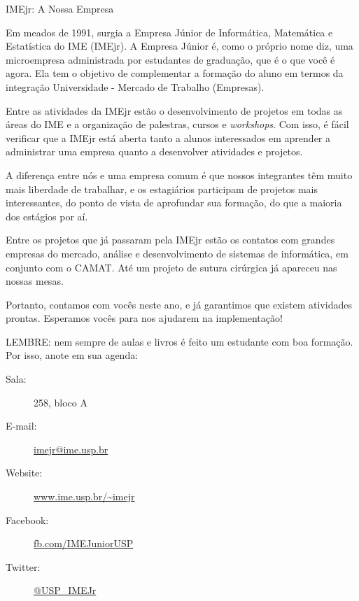 \begin{subsecao}{IMEjr: A Nossa Empresa}

Em meados de 1991, surgia a Empresa Júnior de Informática, Matemática
e Estatística do IME (IMEjr). A Empresa Júnior é, como o próprio nome
diz, uma microempresa administrada por estudantes de graduação, que é
o que você é agora. Ela tem o objetivo de complementar a formação do
aluno em termos da integração Universidade - Mercado de Trabalho
(Empresas).

Entre as atividades da IMEjr estão o desenvolvimento de
projetos em todas as áreas do IME e a organização de palestras, cursos
e \textit{workshops}. Com isso, é fácil verificar que a IMEjr está aberta tanto
a alunos interessados em aprender a administrar uma empresa quanto a
desenvolver atividades e projetos.

A diferença entre nós e uma
empresa comum é que nossos integrantes têm muito mais liberdade de
trabalhar, e os estagiários participam de projetos mais interessantes,
do ponto de vista de aprofundar sua formação, do que a maioria dos
estágios por aí.

Entre os projetos que já passaram pela IMEjr estão
os contatos com grandes empresas do mercado, análise e desenvolvimento
de sistemas de informática, em conjunto com o CAMAT. Até um projeto
de sutura cirúrgica já apareceu nas nossas mesas.

Portanto, contamos
com vocês neste ano, e já garantimos que existem atividades
prontas. Esperamos vocês para nos ajudarem na implementação!

LEMBRE: nem sempre de aulas e livros é feito um estudante com boa
formação. Por isso, anote em sua agenda: 
\begin{description}
\item [Sala:] 258, bloco A
\item[E-mail:] \url{imejr@ime.usp.br}
\item[Website:] \url{www.ime.usp.br/~imejr}
\item[Facebook:] \url{fb.com/IMEJuniorUSP}
\item[Twitter:] \url{@USP_IMEJr}
\end{description}

\end{subsecao}
